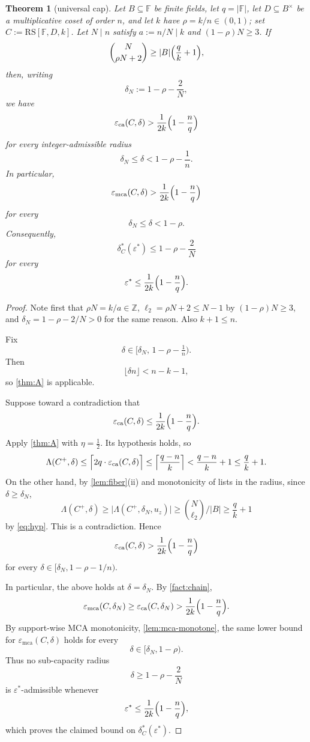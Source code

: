 \documentclass[11pt]{article}
\newtheorem{theorem}{Theorem}[section]
\theoremstyle{definition}
\theoremstyle{remark}
\newcommand{\F}{\mathbb{F}}
\newcommand{\B}{B}
\newcommand{\RS}{\mathrm{RS}}
\newcommand{\eca}{\varepsilon_{\mathrm{ca}}}
\newcommand{\emca}{\varepsilon_{\mathrm{mca}}}
\newcommand{\Lst}{\Lambda}
\begin{document}
\begin{theorem}[universal cap]\label{thm:main}
Let $\B\subseteq\F$ be finite fields, let $q=|\F|$, let $D\subseteq\B^\times$ be a multiplicative coset of order $n$, and let $k$ have $\rho=k/n\in(0,1)$; set $C:=\RS[\F,D,k]$. Let $N\mid n$ satisfy $a:=n/N\mid k$ and $(1-\rho)N\ge3$. If
\begin{equation}\label{eq:hyp}
        \binom{N}{\rho N+2}
        \ge
        |\B|\Bigl(\frac qk+1\Bigr),
\end{equation}
then, writing
\[
        \delta_N:=1-\rho-\frac2N,
\]
we have
\[
\eca(C,\delta)
>
\frac1{2k}\Bigl(1-\frac nq\Bigr)
\]
for every integer-admissible radius
\[
        \delta_N\le \delta < 1-\rho-\frac1n .
\]
In particular,
\[
        \emca(C,\delta)
        >
        \frac1{2k}\Bigl(1-\frac nq\Bigr)
\]
for every
\[
        \delta_N\le \delta < 1-\rho .
\]
Consequently,
\[
        \delta^*_C(\varepsilon^*)
        \le
        1-\rho-\frac2N
\]
for every
\[
        \varepsilon^*
        \le
        \frac1{2k}\Bigl(1-\frac nq\Bigr).
\]
\end{theorem}

\begin{proof}
Note first that $\rho N=k/a\in\mathbb Z$, $\ell_2=\rho N+2\le N-1$ by $(1-\rho)N\ge3$, and $\delta_N=1-\rho-2/N>0$ for the same reason. Also $k+1\le n$.

Fix
\[
        \delta\in[\delta_N,\,1-\rho-\tfrac1n).
\]
Then
\[
        \lfloor \delta n\rfloor < n-k-1,
\]
so \cref{thm:A} is applicable.

Suppose toward a contradiction that
\[
        \eca(C,\delta)
        \le
        \frac1{2k}\Bigl(1-\frac nq\Bigr).
\]
Apply \cref{thm:A} with $\eta=\frac12$. Its hypothesis holds, so
\[
        \Lst(C^+,\delta)
        \le
        \Bigl\lceil 2q\cdot \eca(C,\delta)\Bigr\rceil
        \le
        \Bigl\lceil\frac{q-n}{k}\Bigr\rceil
        <
        \frac{q-n}{k}+1
        \le
        \frac qk+1 .
\]
On the other hand, by \cref{lem:fiber}(ii) and monotonicity of lists in the radius, since $\delta\ge\delta_N$,
\[
        \Lst(C^+,\delta)
        \ge
        \bigl|\Lst(C^+,\delta_N,u_z)\bigr|
        \ge
        \binom{N}{\ell_2}\Big/|\B|
        \ge
        \frac qk+1
\]
by \eqref{eq:hyp}. This is a contradiction. Hence
\[
        \eca(C,\delta)
        >
        \frac1{2k}\Bigl(1-\frac nq\Bigr)
\]
for every $\delta\in[\delta_N,1-\rho-1/n)$.

In particular, the above holds at $\delta=\delta_N$. By \cref{fact:chain},
\[
        \emca(C,\delta_N)
        \ge
        \eca(C,\delta_N)
        >
        \frac1{2k}\Bigl(1-\frac nq\Bigr).
\]
By support-wise MCA monotonicity, \cref{lem:mca-monotone}, the same lower bound for $\emca(C,\delta)$ holds for every
\[
        \delta\in[\delta_N,1-\rho).
\]
Thus no sub-capacity radius
\[
        \delta\ge 1-\rho-\frac2N
\]
is $\varepsilon^*$-admissible whenever
\[
        \varepsilon^*
        \le
        \frac1{2k}\Bigl(1-\frac nq\Bigr),
\]
which proves the claimed bound on $\delta^*_C(\varepsilon^*)$.
\end{proof}
\end{document}
